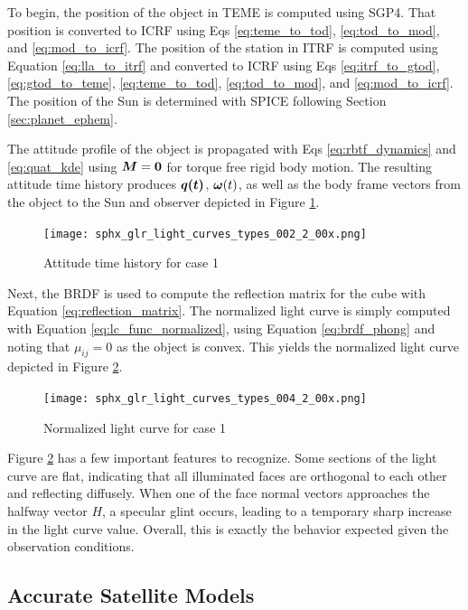 To begin, the position of the object in TEME is computed using SGP4. That position is converted to ICRF using Eqs \ref{eq:teme_to_tod}, \ref{eq:tod_to_mod}, and \ref{eq:mod_to_icrf}. The position of the station in ITRF is computed using Equation \ref{eq:lla_to_itrf} and converted to ICRF using Eqs \ref{eq:itrf_to_gtod}, \ref{eq:gtod_to_teme}, \ref{eq:teme_to_tod}, \ref{eq:tod_to_mod}, and \ref{eq:mod_to_icrf}. The position of the Sun is determined with SPICE following Section \ref{sec:planet_ephem}. 

The attitude profile of the object is propagated with Eqs \ref{eq:rbtf_dynamics} and \ref{eq:quat_kde} using $\bm{M}=\mathbf{0}$ for torque free rigid body motion. The resulting attitude time history produces $\bm{\bm{q}(t)}$, $\bm{\omega}(t)$, as well as the body frame vectors from the object to the Sun and observer depicted in Figure \ref{fig:case1_attitude}.

\begin{figure}[!htb]
  \centering
  \texttt{[image: sphx\_glr\_light\_curves\_types\_002\_2\_00x.png]}
  \caption{Attitude time history for case 1}
  \label{fig:case1_attitude}
\end{figure}

Next, the BRDF is used to compute the reflection matrix for the cube with Equation \ref{eq:reflection_matrix}. The normalized light curve is simply computed with Equation \ref{eq:lc_func_normalized}, using Equation \ref{eq:brdf_phong} and noting that $\mu_{ij} = 0$ as the object is convex. This yields the normalized light curve depicted in Figure \ref{fig:case1_lc}.

\begin{figure}[!htb]
  \centering
  \texttt{[image: sphx\_glr\_light\_curves\_types\_004\_2\_00x.png]}
  \caption{Normalized light curve for case 1}
  \label{fig:case1_lc}
\end{figure}

Figure \ref{fig:case1_lc} has a few important features to recognize. Some sections of the light curve are flat, indicating that all illuminated faces are orthogonal to each other and reflecting diffusely. When one of the face normal vectors approaches the halfway vector $H$, a specular glint occurs, leading to a temporary sharp increase in the light curve value. Overall, this is exactly the behavior expected given the observation conditions.

\subsection{Accurate Satellite Models}

